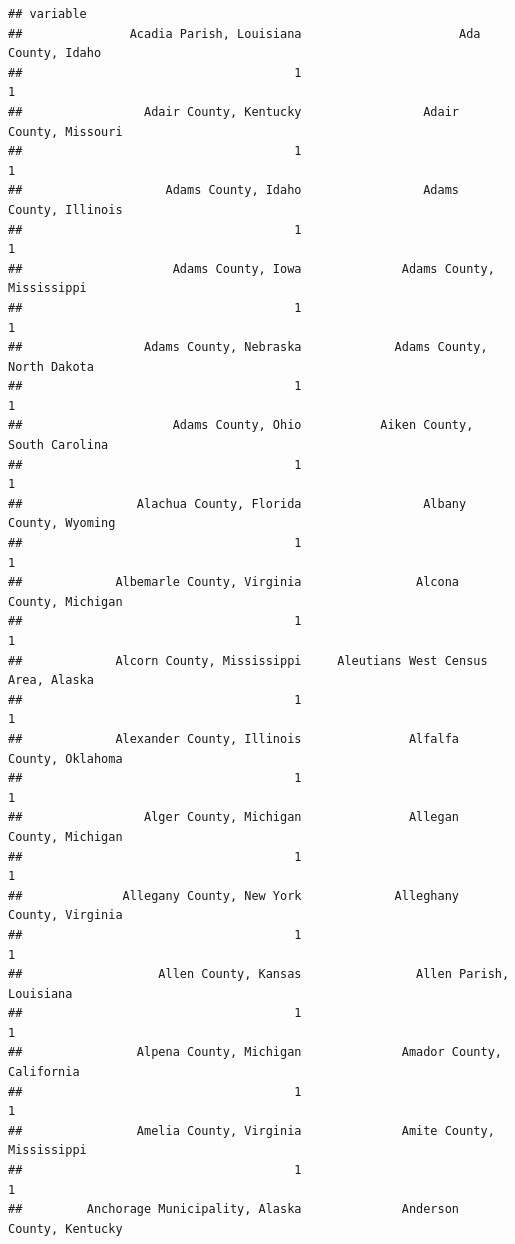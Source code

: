 \documentclass[
]{article}
\begin{document}
\begin{verbatim}
## variable
##               Acadia Parish, Louisiana                      Ada County, Idaho 
##                                      1                                      1 
##                 Adair County, Kentucky                 Adair County, Missouri 
##                                      1                                      1 
##                    Adams County, Idaho                 Adams County, Illinois 
##                                      1                                      1 
##                     Adams County, Iowa              Adams County, Mississippi 
##                                      1                                      1 
##                 Adams County, Nebraska             Adams County, North Dakota 
##                                      1                                      1 
##                     Adams County, Ohio           Aiken County, South Carolina 
##                                      1                                      1 
##                Alachua County, Florida                 Albany County, Wyoming 
##                                      1                                      1 
##             Albemarle County, Virginia                Alcona County, Michigan 
##                                      1                                      1 
##             Alcorn County, Mississippi     Aleutians West Census Area, Alaska 
##                                      1                                      1 
##             Alexander County, Illinois               Alfalfa County, Oklahoma 
##                                      1                                      1 
##                 Alger County, Michigan               Allegan County, Michigan 
##                                      1                                      1 
##              Allegany County, New York             Alleghany County, Virginia 
##                                      1                                      1 
##                   Allen County, Kansas                Allen Parish, Louisiana 
##                                      1                                      1 
##                Alpena County, Michigan              Amador County, California 
##                                      1                                      1 
##                Amelia County, Virginia              Amite County, Mississippi 
##                                      1                                      1 
##         Anchorage Municipality, Alaska              Anderson County, Kentucky 

\end{verbatim}
\end{document}
